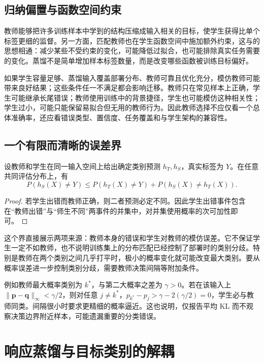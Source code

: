 \documentclass[UTF8,12pt,a4paper,fontset=fandol]{ctexart}
\begin{document}
\subsection{归纳偏置与函数空间约束}
教师能够把许多训练样本中学到的结构压缩成输入相关的目标，使学生获得比单个标签更细的监督。另一方面，匹配教师也在学生函数空间中施加额外约束，这与的思想相通：减少某些不受约束的变化，可能降低过拟合，也可能排除真实任务需要的变化。蒸馏不是简单增加样本标签数量，而是改变哪些函数被训练目标偏好。

如果学生容量足够、蒸馏输入覆盖部署分布、教师可靠且优化充分，模仿教师可能带来良好结果；这些条件任一不满足都会影响迁移。教师只在常见样本上正确，学生可能继承长尾错误；教师使用训练中的背景捷径，学生也可能模仿这种相关性；学生过小，可能只能保留易拟合但无用的教师行为。因此教师选择不应仅看一个总体准确率，还应看错误类型、置信度、任务覆盖和与学生架构的兼容性。

\subsection{一个有限而清晰的误差界}
\begin{proposition}[对教师的一致性只能控制一部分错误]
设教师和学生在同一输入空间上给出确定类别预测 $h_T,h_S$，真实标签为 $Y$。在任意共同评估分布上，有
\begin{equation}
 P(h_S(X)\ne Y)\leq P(h_T(X)\ne Y)+P(h_S(X)\ne h_T(X)).
 \label{eq:kd-disagreement-bound}
\end{equation}
\end{proposition}
\begin{proof}
若学生出错而教师正确，则二者预测必定不同。因此学生出错事件包含在“教师出错”与“师生不同”两事件的并集中，对并集使用概率的次可加性即可。
\end{proof}

这个界直接展示两项来源：教师本身的错误和学生对教师的模仿误差。它不保证学生一定不如教师，也不说明训练集上的分布匹配已经控制了部署时的类别分歧。特别是教师在两个类别之间几乎打平时，极小的概率变化就可能改变最大类别。要从概率误差进一步控制类别分歧，需要教师决策间隔等附加条件。

例如教师最大概率类别为 $k^*$，与第二大概率之差为 $\gamma>0$。若在该输入上 $\|\mathbf p-\mathbf q\|_\infty<\gamma/2$，则对任意 $j\ne k^*$，$p_{k^*}-p_j>\gamma-2(\gamma/2)=0$，学生必与教师同类。间隔很小时要求更精细的概率逼近。这也说明，仅报告平均 KL 而不观察决策边界附近样本，可能遗漏重要的分类错误。

\section{响应蒸馏与目标类别的解耦}
\label{sec:kd-response}
\end{document}
